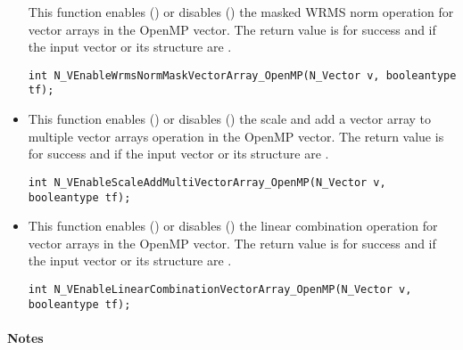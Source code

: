 \begin{itemize}
This function enables () or disables () the masked WRMS
norm operation for vector arrays in the OpenMP vector. The return value is
 for success and  if the input vector or its  structure are
.

\verb|int N_VEnableWrmsNormMaskVectorArray_OpenMP(N_Vector v, booleantype tf);|


\item {}

This function enables () or disables () the scale and
add a vector array to multiple vector arrays operation in the OpenMP vector. The
return value is  for success and  if the input vector or its
 structure are .

\verb|int N_VEnableScaleAddMultiVectorArray_OpenMP(N_Vector v, booleantype tf);|


\item {}

This function enables () or disables () the linear
combination operation for vector arrays in the OpenMP vector. The return value
is  for success and  if the input vector or its  structure
are .

\verb|int N_VEnableLinearCombinationVectorArray_OpenMP(N_Vector v, booleantype tf);|

\end{itemize}
\paragraph{\bf Notes}                                                      
           

